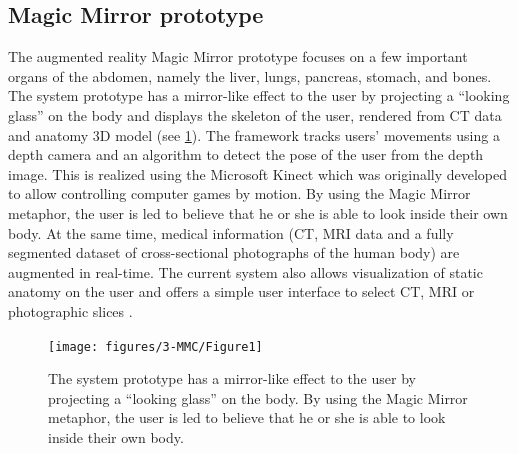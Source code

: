 \subsection{Magic Mirror prototype}
The augmented reality Magic Mirror prototype focuses on a few important organs of the abdomen, namely the liver, lungs, pancreas, stomach, and bones.  
The system prototype has a mirror-like effect to the user by projecting a ``looking glass'' on the body and displays the skeleton of the user, rendered from CT data and anatomy 3D model (see \figurename{\ref{fig:3-MMC:Prototype}}). 
The framework tracks users' movements using a depth camera and an algorithm to detect the pose of the user from the depth image. This is realized using the Microsoft Kinect which was originally developed to allow controlling computer games by motion. 
By using the Magic Mirror metaphor, the user is led to believe that he or she is able to look inside their own body. At the same time, medical information (CT, MRI data and a fully segmented dataset of cross-sectional photographs of the human body) are augmented in real-time. The current system also allows visualization of static anatomy on the user and offers a simple user interface to select CT, MRI or photographic slices \cite{Blum2012,Navab2012a}.
\begin{figure}
	\centering
	\texttt{[image: figures/3-MMC/Figure1]}
	\caption[The Magic Mirror prototype.]{The system prototype has a mirror-like effect to the user by projecting a ``looking glass'' on the body. By using the Magic Mirror metaphor, the user is led to believe that he or she is able to look inside their own body.}
	\label{fig:3-MMC:Prototype}
\end{figure}

